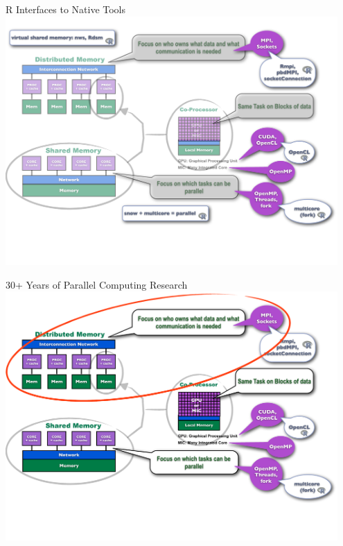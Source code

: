 \begin{frame}
\begin{block}{R Interfaces to Native Tools}
    \includegraphics[width=0.95\textwidth]{../common/pics/ParallelHardware7.pdf}
\end{block}
\end{frame}

\begin{frame}
\begin{block}{30+ Years of Parallel Computing Research}
    \includegraphics[width=0.95\textwidth]{../common/pics/ParallelHardware8.pdf}
\end{block}
\end{frame}

